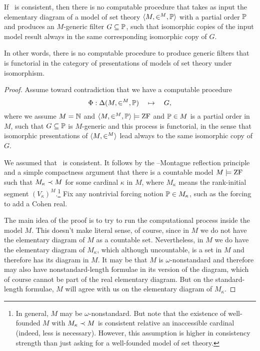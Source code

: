 \documentclass{amsart}
\begin{document}
\begin{theorem}\label{Theorem.No-Turing-functor}
 If \ZF\ is consistent, then there is no computable procedure that takes as input the elementary diagram of a model of set theory $\<M,\in^M,\P>$ with a partial order $\P$ and produces an $M$-generic filter $G\of \P$, such that isomorphic copies of the input model result always in the same corresponding isomorphic copy of $G$.
\end{theorem}

\noindent In other words, there is no computable procedure to produce generic filters that is functorial in the category of presentations of models of set theory under isomorphism.

\begin{proof}
Assume toward contradiction that we have a computable procedure
 $$\Phi:\Delta(M,\in^M,\P)\quad\mapsto\quad G,$$
where we assume $M=\N$ and $\<M,\in^M,\P>\satisfies\ZF$ and $\P\in M$ is a partial order in $M$, such that $G\of\P$ is $M$-generic and this process is functorial, in the sense that isomorphic presentations of $\<M,\in^M>$ lead always to the same isomorphic copy of $G$.

We assumed that \ZF\ is consistent. It follows by the \Levy--Montague reflection principle and a simple compactness argument that there is a countable model $M\satisfies\ZF$ such that $M_\kappa\elesub M$ for some cardinal $\kappa$ in $M$, where $M_\kappa$ means the rank-initial segment $(V_\kappa)^M$.\footnote{In general, $M$ may be $\omega$-nonstandard. But note that the existence of well-founded $M$ with $M_\kappa \elesub M$ is consistent relative an inaccessible cardinal (indeed, less is necessary). However, this assumption is higher in consistency strength than just asking for a well-founded model of set theory.}
Fix any nontrivial forcing notion $\P\in M_\kappa$, such as the forcing to add a Cohen real.

The main idea of the proof is to try to run the computational process inside the model $M$. This doesn't make literal sense, of course, since in $M$ we do not have the elementary diagram of $M$ as a countable set. Nevertheless, in $M$ we do have the elementary diagram of $M_\kappa$, which although uncountable, is a set in $M$ and therefore has its diagram in $M$. It may be that $M$ is $\omega$-nonstandard and therefore may also have nonstandard-length formulae in its version of the diagram, which of course cannot be part of the real elementary diagram. But on the standard-length formulae, $M$ will agree with us on the elementary diagram of $M_\kappa$.


\end{proof}
\end{document}

